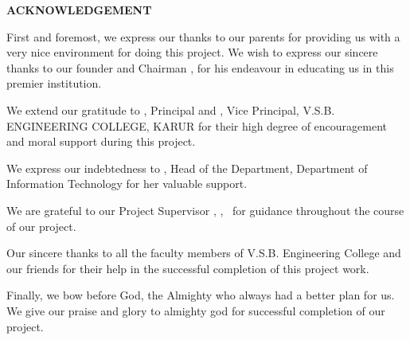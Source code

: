 \thispagestyle{empty}
\begin{center}
  {\fontsize{16pt}{20pt}\selectfont\bfseries ACKNOWLEDGEMENT\par}
\end{center}
\vspace{0.5cm}

{\fontsize{14pt}{22pt}\selectfont
First and foremost, we express our thanks to our parents for providing us with a very nice environment for doing this project. We wish to express our sincere thanks to our founder and Chairman \textbf{\ChairmanName}, for his endeavour in educating us in this premier institution.

We extend our gratitude to \textbf{\PrincipalName}, Principal and \textbf{\VicePrincipalName}, Vice Principal, V.S.B. ENGINEERING COLLEGE, KARUR for their high degree of encouragement and moral support during this project.

We express our indebtedness to \textbf{\HODName}, Head of the Department, Department of Information Technology for her valuable support.

We are grateful to our Project Supervisor \textbf{\SupervisorName}, \SupervisorDesignation, \SupervisorDepartment\ for guidance throughout the course of our project.

Our sincere thanks to all the faculty members of V.S.B. Engineering College and our friends for their help in the successful completion of this project work.

Finally, we bow before God, the Almighty who always had a better plan for us. We give our praise and glory to almighty god for successful completion of our project.\par}
\newpage
